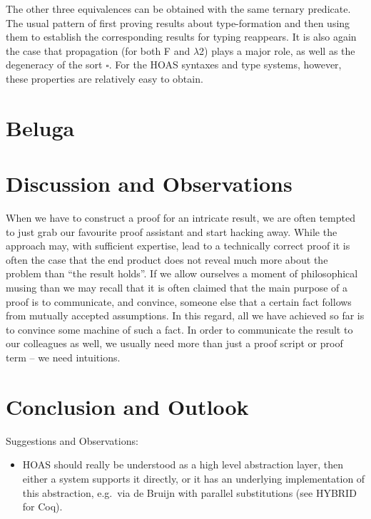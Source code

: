 \documentclass[a4paper,UKenglish]{lipics-v2016}
\newcommand{\SysL}{$\lambda$2\xspace}
\newcommand{\Typ}{\ensuremath{\square}}
\begin{document}
The other three equivalences can be obtained with the same ternary predicate.
The usual pattern of first proving results about type-formation and then using them to establish the corresponding results for typing reappears.
It is also again the case that propagation (for both F and \SysL) plays a major role, as well as the degeneracy of the sort $\Typ$.
For the HOAS syntaxes and type systems, however, these properties are relatively easy to obtain.

\section{Beluga}
\label{sec:beluga}


\section{Discussion and Observations}
\label{sec:disc-observ}

When we have to construct a proof for an intricate result, we are often tempted to just grab our favourite proof assistant and start hacking away.
While the approach may, with sufficient expertise, lead to a technically correct proof it is often the case that the end product does not reveal much more about the problem than ``the result holds''.
If we allow ourselves a moment of philosophical musing than we may recall that it is often claimed that the main purpose of a proof is to communicate, and convince, someone else that a certain fact follows from mutually accepted assumptions.
In this regard, all we have achieved so far is to convince some machine of such a fact.
In order to communicate the result to our colleagues as well, we usually need more than just a proof script or proof term -- we need intuitions.


\section{Conclusion and Outlook}
\label{sec:conclusion}

Suggestions and Observations:
\begin{itemize}
\item HOAS should really be understood as a high level abstraction layer, then either a system supports it directly, or it has an underlying implementation of this abstraction, e.g.\ via de Bruijn with parallel substitutions (see HYBRID for Coq).
\end{itemize}
\end{document}
